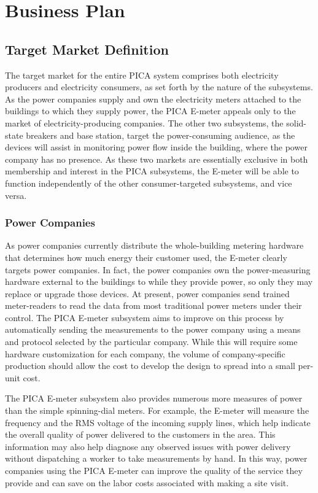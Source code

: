 \section{Business Plan}

\subsection{Target Market Definition} %
The target market for the entire PICA system comprises both electricity producers and electricity consumers, as set forth by the nature of the subsystems. As the power companies supply and own the electricity meters attached to the buildings to which they supply power, the PICA E-meter appeals only to the market of electricity-producing companies. The other two subsystems, the solid-state breakers and base station, target the power-consuming audience, as the devices will assist in monitoring power flow inside the building, where the power company has no presence. As these two markets are essentially exclusive in both membership and interest in the PICA subsystems, the E-meter will be able to function independently of the other consumer-targeted subsystems, and vice versa.

\subsubsection{Power Companies} %
As power companies currently distribute the whole-building metering hardware that determines how much energy their customer used, the E-meter clearly targets power companies. In fact, the power companies own the power-measuring hardware external to the buildings to while they provide power, so only they may replace or upgrade those devices. At present, power companies send trained meter-readers to read the data from most traditional power meters under their control. The PICA E-meter subsystem aims to improve on this process by automatically sending the measurements to the power company using a means and protocol selected by the particular company. While this will require some hardware customization for each company, the volume of company-specific production should allow the cost to develop the design to spread into a small per-unit cost.

The PICA E-meter subsystem also provides numerous more measures of power than the simple spinning-dial meters. For example, the E-meter will measure the frequency and the RMS voltage of the incoming supply lines, which help indicate the overall quality of power delivered to the customers in the area. This information may also help diagnose any observed issues with power delivery without dispatching a worker to take measurements by hand. In this way, power companies using the PICA E-meter can improve the quality of the service they provide and can save on the labor costs associated with making a site visit.


